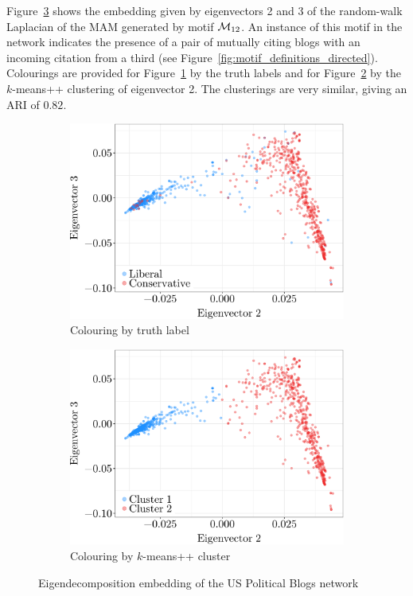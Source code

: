Figure~\ref{fig:polblogs_embedding} shows the embedding given by eigenvectors 2 and 3 of the random-walk Laplacian of the MAM generated by motif $\mathcal{M}_{12}$. An instance of this motif in the network indicates the presence of a pair of mutually citing blogs with an incoming citation from a third (see Figure~\ref{fig:motif_definitions_directed}). Colourings are provided for Figure~\ref{fig:polblogs_embedding_truth} by the truth labels and for Figure~\ref{fig:polblogs_embedding_kmeans} by the $k$-means++ clustering of eigenvector 2. The clusterings are very similar, giving an ARI of $0.82$.


\vspace*{0.5cm}
\begin{figure}[H]
	\begin{subfigure}{.49\textwidth}
		\centering
		\includegraphics[scale=0.4,draft=false]{../../results/polblogs/polblogs_M12_truth.pdf}
		\caption{Colouring by truth label}
		\label{fig:polblogs_embedding_truth}
	\end{subfigure}
	\begin{subfigure}{.49\textwidth}
		\centering
		\includegraphics[scale=0.4,draft=false]{../../results/polblogs/polblogs_M12_clusts.pdf}
		\caption{Colouring by $k$-means++ cluster}
		\label{fig:polblogs_embedding_kmeans}
	\end{subfigure}
	\caption{Eigendecomposition embedding of the US Political Blogs network}
	\label{fig:polblogs_embedding}
\end{figure}

